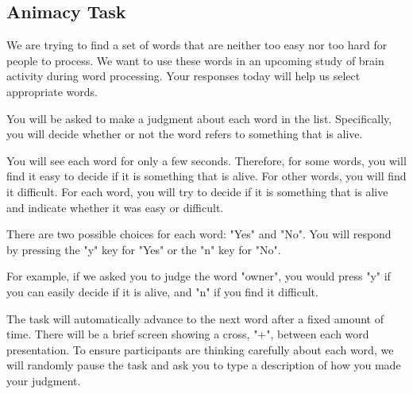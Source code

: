 \documentclass[man,natbib,floatsintext]{apa6} %
\begin{document}
\subsection{Animacy Task}
\begin{displayquote}
We are trying to find a set of words that are neither too easy nor too hard for people to process. We want to use these words in an upcoming study of brain activity during word processing. Your responses today will help us select appropriate words.

You will be asked to make a judgment about each word in the list. Specifically, you will decide whether or not the word refers to something that is alive.

You will see each word for only a few seconds. Therefore, for some words, you will find it easy to decide if it is something that is alive. For other words, you will find it difficult. For each word, you will try to decide if it is something that is alive and indicate whether it was easy or difficult.

There are two possible choices for each word: "Yes" and "No". You will respond by pressing the "y" key for "Yes" or the "n" key for "No".

For example, if we asked you to judge the word "owner", you would press "y" if you can easily decide if it is alive, and "n" if you find it difficult.

The task will automatically advance to the next word after a fixed amount of time. There will be a brief screen showing a cross, "+", between each word presentation.
To ensure participants are thinking carefully about each word, we will randomly pause the task and ask you to type a description of how you made your judgment.
\end{displayquote}
\end{document}

